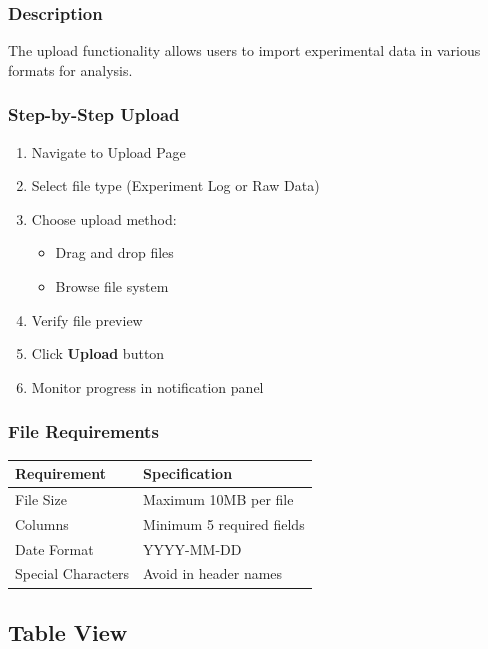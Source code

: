 \documentclass[12pt]{article}
\begin{document}
\subsubsection*{Description}
The upload functionality allows users to import experimental data in various
formats for analysis.

\subsubsection{Step-by-Step Upload}
\begin{enumerate}
    \item Navigate to Upload Page
    \item Select file type (Experiment Log or Raw Data)
    \item Choose upload method:
    \begin{itemize}
        \item Drag and drop files
        \item Browse file system
    \end{itemize}
    \item Verify file preview
    \item Click \textbf{Upload} button
    \item Monitor progress in notification panel
\end{enumerate}

\subsubsection{File Requirements}
\begin{table}[H]
    \centering
    \begin{tabularx}{\textwidth}{lX}
        \toprule
        \textbf{Requirement} & \textbf{Specification} \\
        \midrule
        File Size & Maximum 10MB per file \\
        Columns & Minimum 5 required fields \\
        Date Format & YYYY-MM-DD \\
        Special Characters & Avoid in header names \\
        \bottomrule
    \end{tabularx}
\end{table}

\subsection{Table View}
\end{document}
